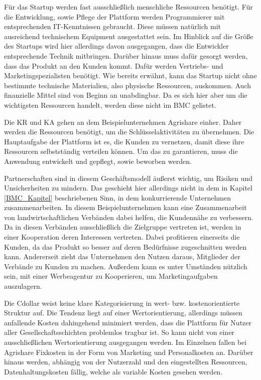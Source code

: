 Für das Startup werden fast ausschließlich menschliche Ressourcen benötigt. Für die Entwicklung, sowie Pflege der Plattform werden Programmierer mit entsprechenden IT-Kenntnissen gebraucht. Diese müssen natürlich mit ausreichend technischem Equipment ausgestattet sein. Im Hinblick auf die Größe des Startups wird hier allerdings davon ausgegangen, dass die Entwickler entsprechende Technik mitbringen. Darüber hinaus muss dafür gesorgt werden, dass das Produkt an den Kunden kommt. Dafür werden Vertriebs- und Marketingspezialisten benötigt. Wie bereits erwähnt, kann das Startup nicht ohne bestimmte technische Materialien, also physische Ressourcen, auskommen. Auch finanzielle Mittel sind von Beginn an unabdingbar. Da es sich hier aber um die wichtigsten Ressourcen handelt, werden diese nicht im \ac{BMC} gelistet.

Die \ac{KR} und \ac{KA} gehen an dem Beispielunternehmen Agrishare einher. Daher werden die Ressourcen benötigt, um die Schlüsselaktivitäten zu übernehmen. Die Hauptaufgabe der Plattform ist es, die Kunden zu vernetzen, damit diese ihre Ressourcen selbstständig verteilen können. Um das zu garantieren, muss die Anwendung entwickelt und gepflegt, sowie beworben werden. 

Partnerschaften sind in diesem Geschäftsmodell äußerst wichtig, um Risiken und Unsicherheiten zu mindern. Das geschieht hier allerdings nicht in dem in Kapitel \ref{BMC_Kapitel} beschriebenen Sinn, in dem konkurrierende Unternehmen zusammenarbeiten. In diesem Beispielunternehmen kann eine Zusammenarbeit von landwirtschaftlichen Verbänden dabei helfen, die Kundennähe zu verbessern. Da in diesen Verbänden ausschließlich die Zielgruppe vertreten ist, werden in einer Kooperation deren Interessen vertreten. Dabei profitieren einerseits die Kunden, da das Produkt so besser auf deren Bedürfnisse zugeschnitten werden kann. Andererseit zieht das Unternehmen den Nutzen daraus, Mitglieder der Verbände zu Kunden zu machen. Außerdem kann es unter Umständen nützlich sein, mit einer Werbeagentur zu Kooperieren, um Marketingaufgaben auszulagern. 

Die \ac{Cdollar} weist keine klare Kategorisierung in wert- bzw. kostenorientierte Struktur auf. Die Tendenz liegt auf einer Wertorientierung, allerdings müssen anfallende Kosten dahingehend minimiert werden, dass die Plattform für Nutzer aller Gesellschaftsschichten problemlos tragbar ist. So kann nicht von einer ausschließlichen Wertorientierung ausgegangen werden. Im Einzelnen fallen bei Agrishare Fixkosten in der Form von Marketing und Personalkosten an. Darüber hinaus werden, abhängig von der Nutzerzahl und den eingestellten Ressourcen, Datenhaltungskosten fällig, welche als variable Kosten gesehen werden.